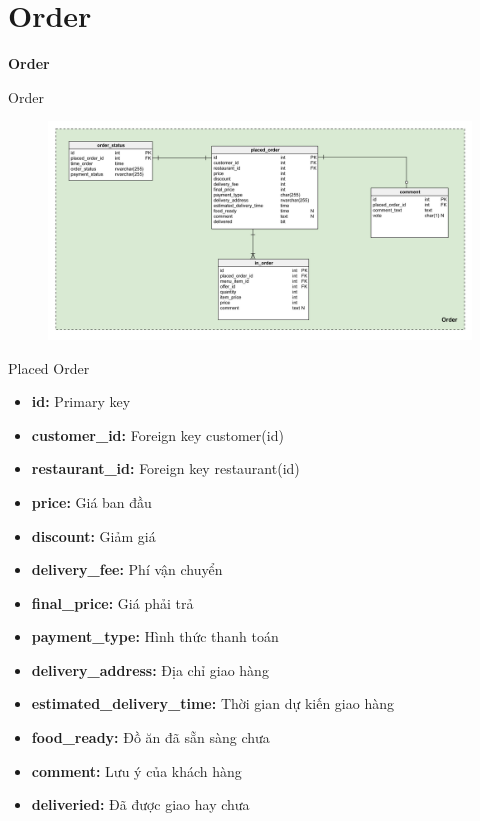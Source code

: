 \documentclass[aspectratio=43,xcolor=dvipsnames]{beamer}
\begin{document}
	\section{Order}
	\begin{frame}
		\textcolor{structure}{\Huge{\textbf{Order}}}
	\end{frame}
	\begin{frame}{Order}
		\begin{figure}[ht!]
			\centerline{\includegraphics[width=1\textwidth]{order.png}}
			\label{fig:ass1}
		\end{figure}
	\end{frame}
	\begin{frame}{Placed Order}
		\begin{itemize}
			\item \textbf{id:} Primary key
			\item \textbf{customer\_id:} Foreign key customer(id)
			\item \textbf{restaurant\_id:} Foreign key restaurant(id)
			\item \textbf{price:} Giá ban đầu
			\item \textbf{discount:} Giảm giá 
			\item \textbf{delivery\_fee: }Phí vận chuyển
			\item \textbf{final\_price:} Giá phải trả
			\item \textbf{payment\_type:} Hình thức thanh toán
			\item \textbf{delivery\_address:} Địa chỉ giao hàng 
			\item \textbf{estimated\_delivery\_time:} Thời gian dự kiến giao hàng
			\item \textbf{food\_ready:} Đồ ăn đã sẵn sàng chưa
			\item \textbf{comment:} Lưu ý của khách hàng
			\item \textbf{deliveried:} Đã được giao hay chưa
		\end{itemize}
	\end{frame}
	
\end{document}
